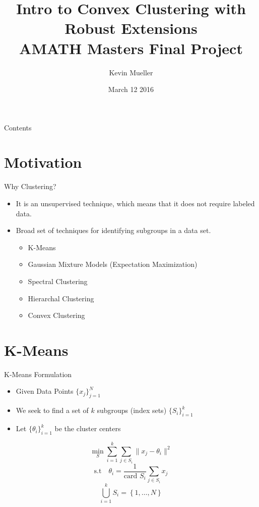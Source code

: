\documentclass[12pt]{beamer}
\author[Mueller]{Kevin Mueller}
\title[Convex Clustering Intro]{Intro to Convex Clustering with Robust Extensions \\ \normalsize AMATH Masters Final Project}
\date{March 12 2016}
\begin{document}
\begin{frame}
\titlepage
\end{frame}

\begin{frame}{Contents}
\tableofcontents
\end{frame}

\section{Motivation}


\begin{frame}{Why Clustering?}
\begin{itemize}
	\item It is an unsupervised technique, which means that it does not require labeled data.
	\item Broad set of techniques for identifying subgroups in a data set. 
		\begin{itemize}
			\item K-Means \\
			\item Gaussian Mixture Models (Expectation Maximization) \\
			\item Spectral Clustering
			\item Hierarchal Clustering
			\item Convex Clustering
		\end{itemize}
\end{itemize}
\end{frame}

\section{K-Means}
\begin{frame}{K-Means Formulation}
\begin{itemize}
	\item Given Data Points $\{ x_j \}_{j=1}^N$\\
	\item We seek to find a set of $k$ subgroups (index sets) $\{S_i \}_{i=1}^k$
	\item Let $\{\theta_i\}_{i=1}^k$ be the cluster centers
\end{itemize}
$$ \min_S \sum_{i=1}^k \sum_{j \in S_i} \lVert x_j - \theta_i \rVert^2 $$
$$ \text{s.t} \quad \theta_i = \frac{1}{\text{card } S_i} \sum_{j \in S_i} x_j $$
$$ \bigcup_{i=1}^k S_i = \left\{1,\dots,N\right\} $$
\end{frame}
\end{document}
